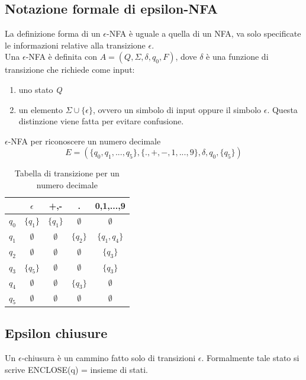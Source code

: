 \documentclass[12pt]{article}
\begin{document}
\newpage
\subsection{Notazione formale di epsilon-NFA}
La definizione forma di un $\epsilon$-NFA è uguale a quella di un NFA, va solo specificate le informazioni relative alla transizione $\epsilon$.
\\ Una $\epsilon$-NFA è definita con $A = (Q, \Sigma, \delta, q_0, F)$, dove $\delta$ è una funzione di transizione che richiede come input: 
\begin{enumerate}
  \item uno stato \emph{Q}
  \item un elemento $\Sigma \cup \{\epsilon\}$, ovvero un simbolo di input oppure il simbolo $\epsilon$. Questa distinzione viene fatta per evitare confusione. 
\end{enumerate}

$\epsilon$-NFA per riconoscere un numero decimale
\[ E = (\{q_0,q_1,...,q_5\}, \{.,+,-,1,...,9\},\delta, q_0, \{q_5\})\]

\begin{table}[ht]
\centering
\begin{tabular}{c || c | c | c | c}
& $\epsilon$ & +,- & . & 0,1,...,9 \\
\hline \hline
  $q_0$ & $\{q_1\}$ & $\{q_1\}$ & $\emptyset$ & $\emptyset$ \\
$q_1$ & $\emptyset$ & $\emptyset$ & $\{q_2\}$ & $\{q_1, q_4\}$ \\
$q_2$ & $\emptyset$ & $\emptyset$ & $\emptyset$ & $\{q_3\}$ \\
$q_3$ & $\{q_5\}$ & $\emptyset$ & $\emptyset$ & $\{q_3\}$ \\
$q_4$ & $\emptyset$ & $\emptyset$ & $\{q_3\}$ & $\emptyset$ \\
$q_5$ & $\emptyset$ & $\emptyset$ & $\emptyset$ & $\emptyset$ \\
\end{tabular}
\caption{Tabella di transizione per un numero decimale}
\end{table}

\subsection{Epsilon chiusure}
Un $\epsilon$-chiusura è un cammino fatto solo di transizioni $\epsilon$. Formalmente tale stato si scrive ENCLOSE(q) = {insieme di stati.}
\end{document}
